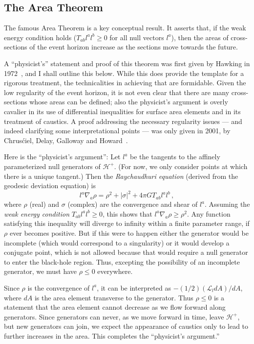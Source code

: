 \documentclass[12pt]{article}
\newcommand{\Hf}{{{\mathscr H}^{+}}} %
\newcommand{\Lie}{{\mathcal L}}
\begin{document}
\subsection{The Area Theorem}

The famous Area Theorem is a key conceptual result.
It asserts that, if the weak energy condition holds ($T_{ab}l^al^b\geq 0$ for all null vectors $l^a$), then the areas of cross-sections of the event horizon increase as the sections move towards the future.

A ``physicist's'' statement and proof of this theorem was first given by Hawking in 1972~\citep{Hawking:1971vc}, and I shall outline this below.  While this does provide the template for a rigorous treatment, the technicalities in achieving that are formidable.  Given the low regularity of the event horizon, it is not even clear that there are many cross-sections whose areas can be defined; also the physicist's argument is overly cavalier in its use of differential inequalities for surface area elements and in its treatment of caustics.  
A proof addressing the necessary regularity issues --- and indeed clarifying some interpretational points --- was only given in 2001, by Chrus\'ciel, Delay, Galloway and Howard~\citep{Chrusciel:2001}.

Here is the ``physicist's argument'':  Let $l^a$ be the tangents to the affinely parameterized null generators of $\Hf$.  (For now, we only consider points at which there is a unique tangent.)  Then the {\em Raychaudhuri equation} (derived from the geodesic deviation equation) is
\begin{equation}
l^a\nabla _a\rho =\rho ^2+|\sigma |^2 +4\pi G T_{ab}l^al^b\, ,
\end{equation}
where $\rho$ (real) and $\sigma$ (complex) are the convergence and shear of $l^a$.  
Assuming the {\em weak energy condition} $T_{ab}l^al^b\geq 0$,
this shows that $l^a\nabla _a\rho\geq \rho ^2$.  
Any function satisfying this inequality will diverge to infinity within a finite parameter range, if 
$\rho$ ever becomes positive. 
But if this were to happen either the generator would be incomplete (which would correspond to a singularity) or it would develop a conjugate point, which is not allowed because that would require a null generator to enter the black-hole region.  Thus, excepting the possibility of an incomplete generator, we must have $\rho\leq 0$ everywhere.

Since $\rho$ is the convergence of $l^a$, it can be interpreted as $-(1/2)(\Lie _l dA)/dA$, where $dA$ is the area element transverse to the generator.  Thus $\rho \leq 0$ is a statement that the area element cannot decrease as we flow forward along generators.  Since generators can never, as we move forward in time, leave $\Hf$, but new generators can join, we expect the appearance of caustics only to lead to further increases in the area. This completes the ``physicist's argument.''
\end{document}
